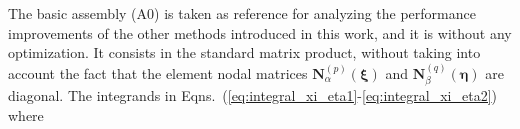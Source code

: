 \documentclass[oneside,onecolumn,10pt,final]{asme2ej}
\newcounter{tema}
\begin{document}
\noindent
The basic assembly (A0) is taken as reference for analyzing 
the performance improvements of the other methods introduced 
in this work, and it is  without any optimization.  
%
It consists in the standard matrix product, without taking 
into account the fact that the element nodal matrices 
$\bm {N}_{\alpha}^{(p)} (\bm{\xi})$ and
$\bm {N}_{\beta}^{(q)} (\bm{\eta})$ are diagonal. The integrands
in Eqns.~(\ref{eq:integral_xi_eta1}-\ref{eq:integral_xi_eta2})
%
%
where
%
\end{document}
